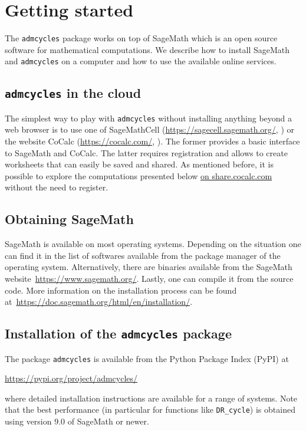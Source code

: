 \documentclass[11pt]{article}
\newcommand{\Sage}{SageMath}
\newcommand{\cocalc}{CoCalc}
\newcommand{\sagecell}{SageMathCell}
\newcommand{\admcycles}{\texttt{admcycles}}
\begin{document}
\section{Getting started}
The \admcycles{} package works on top of \Sage{} which is an open source software for mathematical computations. We describe how to install \Sage{} and \admcycles{} on a computer and how to use the available online services.

\subsection{\admcycles{} in the cloud}
The simplest way to play with \admcycles{} without installing anything beyond a web browser is to use one of \sagecell{} (\url{https://sagecell.sagemath.org/}, \cite{SageMathCell}) or the website \cocalc{} (\url{https://cocalc.com/}, \cite{CoCalc}). The former provides a basic interface to \Sage{} and \cocalc{}. The latter requires registration and allows to create worksheets that can easily be saved and shared. As mentioned before, it is possible to explore the computations presented below  \href{https://share.cocalc.com/share/0a48957b67f375b9e3107216504ca0c4efb678fd/admcycles%20tutorial.ipynb?viewer=share}{on share.cocalc.com} without the need to register.


\subsection{Obtaining \Sage{}}
\Sage{} is available on most operating systems. Depending on the situation one can find it in the list of softwares available from the package manager of the operating system. Alternatively, there are binaries available from the \Sage{} website~\url{https://www.sagemath.org/}. Lastly, one can compile it from the source code. More information on the installation process can be found at~\url{https://doc.sagemath.org/html/en/installation/}.

\subsection{Installation of the \admcycles{} package}
The package \texttt{admcycles} is available from the Python Package Index (PyPI) at
\begin{center}
    \url{https://pypi.org/project/admcycles/}
\end{center}
where detailed installation instructions are available for a range of systems. Note that the best performance (in particular for functions like \verb|DR_cycle|) is obtained using version 9.0 of \Sage{} or newer.
\end{document}
